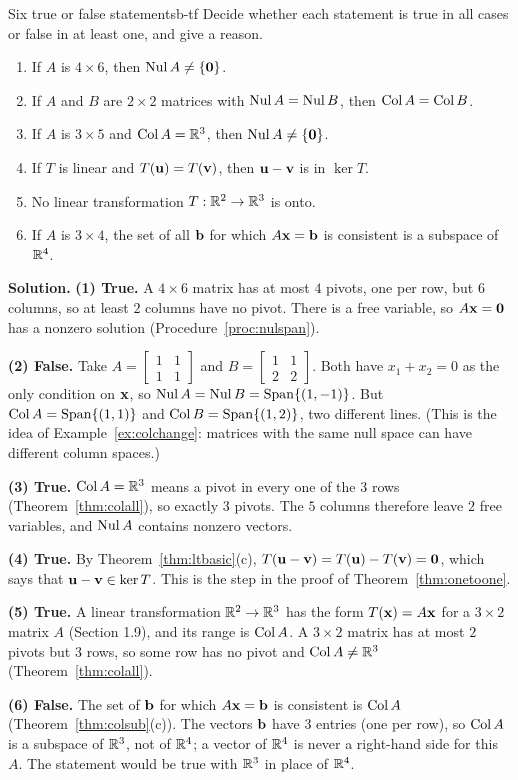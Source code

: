 \documentclass[11pt]{article}
\begin{document}
\begin{exmp}{Six true or false statements}{b-tf}
Decide whether each statement is true in all cases or false in at least one, and give a reason.
\begin{enumerate}[label=(\arabic*),itemsep=1pt]
  \item If $A$ is $4\times6$, then $\operatorname{Nul} A\neq\{\mathbf{0}\}$.
  \item If $A$ and $B$ are $2\times2$ matrices with $\operatorname{Nul} A=\operatorname{Nul} B$, then $\operatorname{Col} A=\operatorname{Col} B$.
  \item If $A$ is $3\times5$ and $\operatorname{Col} A=\mathbb{R}^3$, then $\operatorname{Nul} A\neq\{\mathbf{0}\}$.
  \item If $T$ is linear and $T(\mathbf{u})=T(\mathbf{v})$, then $\mathbf{u}-\mathbf{v}$ is in $\ker T$.
  \item No linear transformation $T:\mathbb{R}^2\to\mathbb{R}^3$ is onto.
  \item If $A$ is $3\times4$, the set of all $\mathbf{b}$ for which $A\mathbf{x}=\mathbf{b}$ is consistent is a subspace of $\mathbb{R}^4$.
\end{enumerate}

\textbf{Solution.} \textbf{(1) True.} A $4\times6$ matrix has at most $4$ pivots, one per row, but $6$ columns, so at least $2$ columns have no pivot. There is a free variable, so $A\mathbf{x}=\mathbf{0}$ has a nonzero solution (Procedure~\ref{proc:nulspan}).

\textbf{(2) False.} Take $A=\begin{bmatrix}1&1\\1&1\end{bmatrix}$ and $B=\begin{bmatrix}1&1\\2&2\end{bmatrix}$. Both have $x_1+x_2=0$ as the only condition on $\mathbf{x}$, so $\operatorname{Nul} A=\operatorname{Nul} B=\operatorname{Span}\{(1,-1)\}$. But $\operatorname{Col} A=\operatorname{Span}\{(1,1)\}$ and $\operatorname{Col} B=\operatorname{Span}\{(1,2)\}$, two different lines. (This is the idea of Example~\ref{ex:colchange}: matrices with the same null space can have different column spaces.)

\textbf{(3) True.} $\operatorname{Col} A=\mathbb{R}^3$ means a pivot in every one of the $3$ rows (Theorem~\ref{thm:colall}), so exactly $3$ pivots. The $5$ columns therefore leave $2$ free variables, and $\operatorname{Nul} A$ contains nonzero vectors.

\textbf{(4) True.} By Theorem~\ref{thm:ltbasic}(c), $T(\mathbf{u}-\mathbf{v})=T(\mathbf{u})-T(\mathbf{v})=\mathbf{0}$, which says that $\mathbf{u}-\mathbf{v}\in\ker T$. This is the step in the proof of Theorem~\ref{thm:onetoone}.

\textbf{(5) True.} A linear transformation $\mathbb{R}^2\to\mathbb{R}^3$ has the form $T(\mathbf{x})=A\mathbf{x}$ for a $3\times2$ matrix $A$ (Section 1.9), and its range is $\operatorname{Col} A$. A $3\times2$ matrix has at most $2$ pivots but $3$ rows, so some row has no pivot and $\operatorname{Col} A\neq\mathbb{R}^3$ (Theorem~\ref{thm:colall}).

\textbf{(6) False.} The set of $\mathbf{b}$ for which $A\mathbf{x}=\mathbf{b}$ is consistent is $\operatorname{Col} A$ (Theorem~\ref{thm:colsub}(c)). The vectors $\mathbf{b}$ have $3$ entries (one per row), so $\operatorname{Col} A$ is a subspace of $\mathbb{R}^3$, not of $\mathbb{R}^4$; a vector of $\mathbb{R}^4$ is never a right-hand side for this $A$. The statement would be true with $\mathbb{R}^3$ in place of $\mathbb{R}^4$.
\end{exmp}
\end{document}
